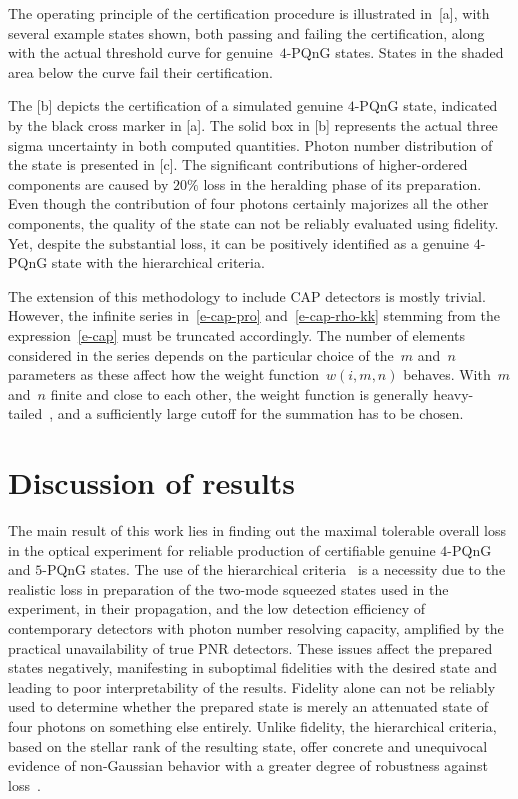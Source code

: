 \documentclass{article}
\begin{document}
The operating principle of the certification procedure is illustrated in~[a], with several example states shown, both passing and failing the certification, along with the actual threshold curve for genuine~$4$-PQnG states. States in the shaded area below the curve fail their certification.

The [b] depicts the certification of a simulated genuine $4$-PQnG state, indicated by the black cross marker in [a]. The solid box in [b] represents the actual three sigma uncertainty in both computed quantities. Photon number distribution of the state is presented in [c]. The significant contributions of higher-ordered components are caused by $20\%$ loss in the heralding phase of its preparation. Even though the contribution of four photons certainly majorizes all the other components, the quality of the state can not be reliably evaluated using fidelity. Yet, despite the substantial loss, it can be positively identified as a genuine $4$-PQnG state with the hierarchical criteria. 

The extension of this methodology to include CAP detectors is mostly trivial. However, the infinite series in~\eqref{e-cap-pro} and~\eqref{e-cap-rho-kk} stemming from the expression~\eqref{e-cap} must be truncated accordingly. The number of elements considered in the series depends on the particular choice of the~$m$ and~$n$ parameters as these affect how the weight function~${w(i, m, n)}$ behaves. With~$m$ and~$n$ finite and close to each other, the weight function is generally heavy-tailed~\cite{provaznik2020}, and a sufficiently large cutoff for the summation has to be chosen.

%

\FloatBarrier
\section{Discussion of results}

The main result of this work lies in finding out the maximal tolerable overall loss in the optical experiment for reliable production of certifiable genuine $4$-PQnG and $5$-PQnG states. The use of the hierarchical criteria~\cite{lachman2019} is a necessity due to the realistic loss in preparation of the two-mode squeezed states used in the experiment, in their propagation, and the low detection efficiency of contemporary detectors with photon number resolving capacity, amplified by the practical unavailability of true PNR detectors. These issues affect the prepared states negatively, manifesting in suboptimal fidelities with the desired state and leading to poor interpretability of the results. Fidelity alone can not be reliably used to determine whether the prepared state is merely an attenuated state of four photons on something else entirely. Unlike fidelity, the hierarchical criteria, based on the stellar rank of the resulting state, offer concrete and unequivocal evidence of non-Gaussian behavior with a greater degree of robustness against loss~\cite{lachman2019}.
\end{document}
